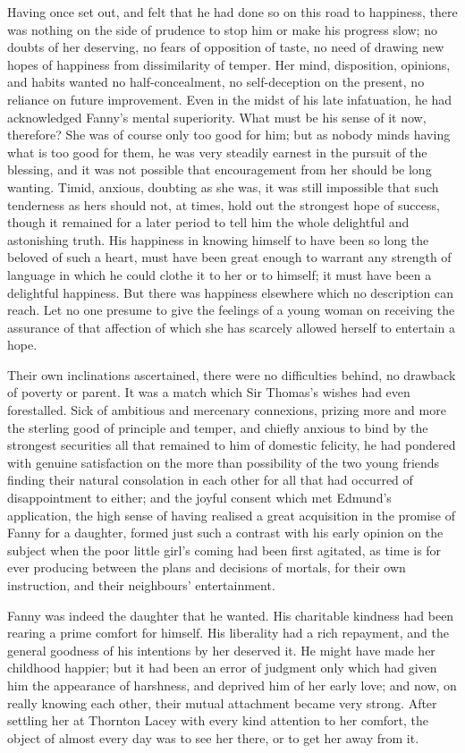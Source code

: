 \documentclass{article}
\begin{document}
Having once set out, and felt that he had done so on
this road to happiness, there was nothing on the side
of prudence to stop him or make his progress slow;
no doubts of her deserving, no fears of opposition of taste,
no need of drawing new hopes of happiness from dissimilarity
of temper.  Her mind, disposition, opinions, and habits
wanted no half-concealment, no self-deception on the present,
no reliance on future improvement.  Even in the midst
of his late infatuation, he had acknowledged Fanny's
mental superiority.  What must be his sense of it now,
therefore?  She was of course only too good for him;
but as nobody minds having what is too good for them,
he was very steadily earnest in the pursuit of the blessing,
and it was not possible that encouragement from her should
be long wanting.  Timid, anxious, doubting as she was,
it was still impossible that such tenderness as hers
should not, at times, hold out the strongest hope of success,
though it remained for a later period to tell him the whole
delightful and astonishing truth.  His happiness in knowing
himself to have been so long the beloved of such a heart,
must have been great enough to warrant any strength of
language in which he could clothe it to her or to himself;
it must have been a delightful happiness.  But there
was happiness elsewhere which no description can reach.
Let no one presume to give the feelings of a young woman
on receiving the assurance of that affection of which
she has scarcely allowed herself to entertain a hope.

Their own inclinations ascertained, there were no
difficulties behind, no drawback of poverty or parent.
It was a match which Sir Thomas's wishes had even forestalled.
Sick of ambitious and mercenary connexions, prizing more
and more the sterling good of principle and temper,
and chiefly anxious to bind by the strongest securities
all that remained to him of domestic felicity, he had
pondered with genuine satisfaction on the more than
possibility of the two young friends finding their natural
consolation in each other for all that had occurred
of disappointment to either; and the joyful consent
which met Edmund's application, the high sense of having
realised a great acquisition in the promise of Fanny
for a daughter, formed just such a contrast with his
early opinion on the subject when the poor little girl's
coming had been first agitated, as time is for ever
producing between the plans and decisions of mortals,
for their own instruction, and their neighbours' entertainment.

Fanny was indeed the daughter that he wanted.  His charitable
kindness had been rearing a prime comfort for himself.
His liberality had a rich repayment, and the general
goodness of his intentions by her deserved it.  He might
have made her childhood happier; but it had been an error
of judgment only which had given him the appearance
of harshness, and deprived him of her early love;
and now, on really knowing each other, their mutual
attachment became very strong.  After settling her at
Thornton Lacey with every kind attention to her comfort,
the object of almost every day was to see her there,
or to get her away from it.
\end{document}
